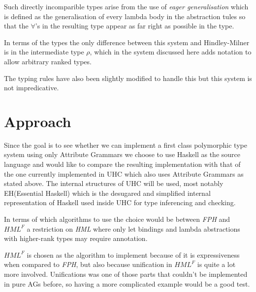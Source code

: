 \documentclass[12pt, a4paper, oneside]{article}
\begin{document}
Such directly incomparible types arise from the use of \textit{eager generalisation} which is defined as the generalisation of every lambda body in the abstraction tules so that the $\forall$'s in the resulting type appear as far right as possible in the type.

In terms of the types the only difference between this system and Hindley-Milner is in the intermediate type $\rho$, which in the system discussed here adds notation to allow arbitrary ranked types.

The typing rules have also been slightly modified to handle this but this system is not impredicative.
\section{Approach}
Since the goal is to see whether we can implement a first class polymorphic type system using only Attribute Grammars we choose to use Haskell as the source language and would like to compare the resulting implementation with that of the one currently implemented in UHC which also uses Attribute Grammars as stated above. The internal structures of UHC will be used, most notably EH(Essential Haskell) which is the desugared and simplified internal representation of Haskell used inside UHC for type inferencing and checking.



In terms of which algorithms to use the choice would be between \textit{FPH} and \textit{$HML^F$} a restriction on \textit{HML} where only let bindings and lambda abstractions with higher-rank types may require annotation.

\textit{$HML^F$} is chosen as the algorithm to implement because of it is expressiveness when compared to \textit{FPH}, but also because unification in \textit{$HML^F$} is quite a lot more involved. Unifications was one of those parts that couldn't be implemented in pure AGs before, so having a more complicated example would be a good test.
\end{document}

